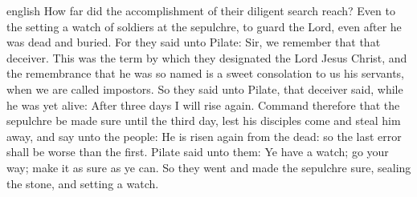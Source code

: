 {english}
{\noindent How far did the accomplishment of their diligent search reach? Even to the setting a watch of soldiers at the sepulchre, to guard the Lord, even after he was dead and buried. For they said unto Pilate: Sir, we remember that that deceiver. This was the term by which they designated the Lord Jesus Christ, and the remembrance that he was so named is a sweet consolation to us his servants, when we are called impostors. So they said unto Pilate, that deceiver said, while he was yet alive: After three days I will rise again. Command therefore that the sepulchre be made sure until the third day, lest his disciples come and steal him away, and say unto the people: He is risen again from the dead: so the last error shall be worse than the first. Pilate said unto them: Ye have a watch; go your way; make it as sure as ye can. So they went and made the sepulchre sure, sealing the stone, and setting a watch.}